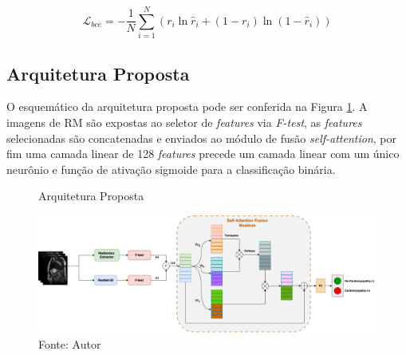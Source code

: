 \begin{equation}
\mathcal{L}_{bce} = -\frac{1}{N} \sum_{i=1}^N
(r_i \ln \hat{r}_i + (1 - r_i) \ln (1 - \hat{r}_i))
\label{eq:bce}
\end{equation}

\subsection{Arquitetura Proposta}
\label{subsec:cap4_arquitetura_proposta}

O esquemático da arquitetura proposta pode ser conferida na Figura \ref{fig:fig011}. A imagens de \gls{RM} são expostas ao seletor de \textit{features} via \textit{F-test}, as \textit{features} selecionadas são concatenadas e enviados ao módulo de fusão \textit{self-attention}, por fim uma camada linear de 128 \textit{features} precede um camada linear com um único neurônio e função de ativação sigmoide para a classificação binária.

\begin{figure}[htbp]
    \centering
    \caption{Arquitetura Proposta}
    \includegraphics[width=1\textwidth]{figures/fig011.png}
    \caption*{Fonte: Autor}
    \label{fig:fig011}
\end{figure}




